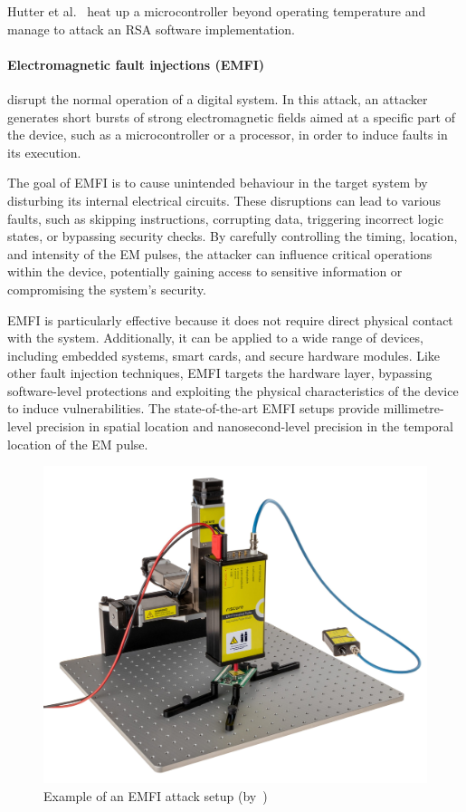 Hutter et al.~\cite{HS-14-cardis} heat up a microcontroller beyond operating temperature and manage to attack an RSA software implementation.

\paragraph{Electromagnetic fault injections (EMFI)} disrupt the normal operation of a digital system. In this attack, an attacker generates short bursts of strong electromagnetic fields aimed at a specific part of the device, such as a microcontroller or a processor, in order to induce faults in its execution.

The goal of EMFI is to cause unintended behaviour in the target system by disturbing its internal electrical circuits. These disruptions can lead to various faults, such as skipping instructions, corrupting data, triggering incorrect logic states, or bypassing security checks. By carefully controlling the timing, location, and intensity of the EM pulses, the attacker can influence critical operations within the device, potentially gaining access to sensitive information or compromising the system's security.

EMFI is particularly effective because it does not require direct physical contact with the system. Additionally, it can be applied to a wide range of devices, including embedded systems, smart cards, and secure hardware modules. Like other fault injection techniques, EMFI targets the hardware layer, bypassing software-level protections and exploiting the physical characteristics of the device to induce vulnerabilities. The state-of-the-art EMFI setups provide millimetre-level precision in spatial location and nanosecond-level precision in the temporal location of the EM pulse.

\begin{figure}[ht]
    \centering
    \includegraphics[width=.5\textwidth]{c2_soa/img/emfi_riscure_setup.jpg}
    \caption{Example of an EMFI attack setup (by~\cite{riscure_emfi})}
    \label{fig:emfi_setup}
\end{figure}


